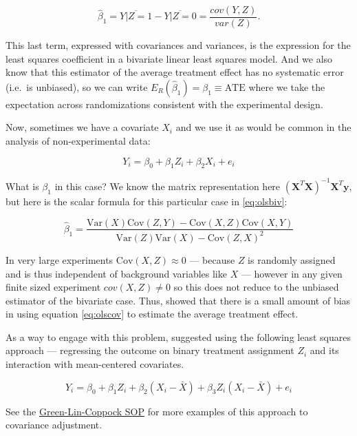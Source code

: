 \documentclass[
  12pt,
]{book}
\theoremstyle{definition}
\theoremstyle{definition}
\theoremstyle{definition}
\theoremstyle{remark}
\begin{document}
\begin{equation}
\hat{\beta}_1 = \overline{Y|Z=1} - \overline{Y|Z=0} = \frac{cov(Y,Z)}{var(Z)}.
\end{equation}

This last term, expressed with covariances and variances, is the
expression for the least squares coefficient in a bivariate linear least
squares model. And we also know that this estimator of the average
treatment effect has no systematic error (i.e.~is unbiased), so we can
write \(E_R(\hat{\beta}_1)=\beta_1 \equiv \text{ATE}\) where we take the
expectation across randomizations consistent with the experimental
design.

Now, sometimes we have a covariate \(X_i\) and we use it as would be
common in the analysis of non-experimental data:

\begin{equation}
Y_i = \beta_0 + \beta_1 Z_i + \beta_2 X_i + e_i \label{eq:olscov}
\end{equation}

What is \(\beta_1\) in this case? We know the matrix representation here
\((\mathbf{X}^{T}\mathbf{X})^{-1}\mathbf{X}^{T}\mathbf{y}\), but here is
the scalar formula for this particular case in \eqref{eq:olsbiv}:

\[ \hat{\beta}_1 = \frac{\mathrm{Var}(X)\mathrm{Cov}(Z,Y) - \mathrm{Cov}(X,Z)\mathrm{Cov}(X,Y)}{\mathrm{Var}(Z)\mathrm{Var}(X) - \mathrm{Cov}(Z,X)^2} \]

In very large experiments \(\mathrm{Cov}(X,Z) \approx 0\) --- because
\(Z\) is randomly assigned and is thus independent of background
variables like \(X\) --- however in any given finite sized experiment
\(cov(X,Z) \ne 0\) so this does not reduce to the unbiased estimator of
the bivariate case. Thus, \citet{freedman2008rae} showed that there is a
small amount of bias in using equation \eqref{eq:olscov} to estimate the
average treatment effect.

As a way to engage with this problem, \citet{lin_agnostic_2013}
suggested using the following least squares approach --- regressing the
outcome on binary treatment assignment \(Z_i\) and its interaction with
mean-centered covariates.

\begin{equation}
Y_i = \beta_0 + \beta_1 Z_i + \beta_2 ( X_i  -  \bar{X} ) + \beta_3 Z_i (X_i - \bar{X}) +  e_i\label{eq:olscov} 
\end{equation}

See the
\href{https://alexandercoppock.com/Green-Lab-SOP/Green_Lab_SOP.html\#using-covariates-in-analysis}{Green-Lin-Coppock
SOP} for more examples of this approach to covariance adjustment.
\end{document}
